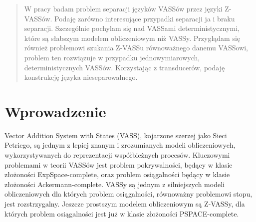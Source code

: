 
\newtheorem{defi}{Definicja}[section]




    \maketitle

    \begin{abstract}
        W pracy badam problem separacji języków VASSów przez języki Z-VASSów.
        Podaję zarówno interesujące przypadki separacji ja i braku separacji.
        Szczególnie pochylam się nad VASSami deterministycznymi, które są słabszym modelem obliczeniowym niż VASSy.
        Przyglądam się również problemowi szukania Z-VASSu równoważnego danemu VASSowi, problem ten rozwiązuje w przypadku
        jednowymiarowych, deterministycznych VASSów.
        Korzystając z transducerów, podaję  konstrukcję języka nieseparowalnego.
    \end{abstract}

    \tableofcontents

    \chapter*{Wprowadzenie}

    Vector Addition System with States (VASS), kojarzone szerzej jako Sieci Petriego, są jednym z lepiej znanym i zrozumianych modeli
    obliczeniowych, wykorzystywanych do reprezentacji współbieżnych procesów.
    Kluczowymi problemami w teorii VASSów jest problem pokrywalności, będący w klasie złożoności ExpSpace-complete, oraz problem
    osiągalności będący w klasie złożoności Ackermann-complete\cite{Ackermann-complete}.
    VASSy są jednym z silniejszych modeli obliczeniowych dla których problem osiągalności, równoważny problemowi stopu, jest rozstrzygalny.
    Jeszcze prostszym modelem obliczeniowym są Z-VASSy, dla których problem osiągalności jest już w klasie złożoności PSPACE-complete.


